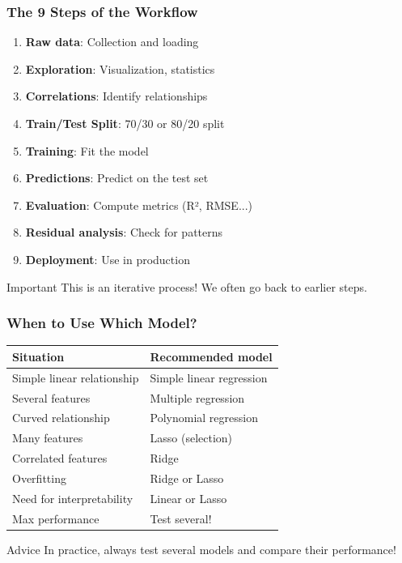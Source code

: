 \documentclass{beamer}
\begin{document}
\begin{frame}
\frametitle{The 9 Steps of the Workflow}
\begin{enumerate}
    \item \textbf{Raw data}: Collection and loading
    \item \textbf{Exploration}: Visualization, statistics
    \item \textbf{Correlations}: Identify relationships
    \item \textbf{Train/Test Split}: 70/30 or 80/20 split
    \item \textbf{Training}: Fit the model
    \item \textbf{Predictions}: Predict on the test set
    \item \textbf{Evaluation}: Compute metrics (R², RMSE...)
    \item \textbf{Residual analysis}: Check for patterns
    \item \textbf{Deployment}: Use in production
\end{enumerate}

\vspace{0.5em}
\begin{alertblock}{Important}
This is an iterative process! We often go back to earlier steps.
\end{alertblock}
\end{frame}






\begin{frame}
\frametitle{When to Use Which Model?}
\begin{table}
\centering
\small
\begin{tabular}{ll}
\toprule
\textbf{Situation} & \textbf{Recommended model} \\
\midrule
Simple linear relationship & Simple linear regression \\
Several features & Multiple regression \\
Curved relationship & Polynomial regression \\
Many features & Lasso (selection) \\
Correlated features & Ridge \\
Overfitting & Ridge or Lasso \\
Need for interpretability & Linear or Lasso \\
Max performance & Test several! \\
\bottomrule
\end{tabular}
\end{table}

\vspace{1em}
\begin{block}{Advice}
In practice, always test several models and compare their performance!
\end{block}
\end{frame}
\end{document}
